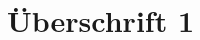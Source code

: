\newpage
\thispagestyle{empty}
\quad  \addtocounter{page}{-1}
\newpage
\chapter{Überschrift 1}
\lipsum[1-5]
